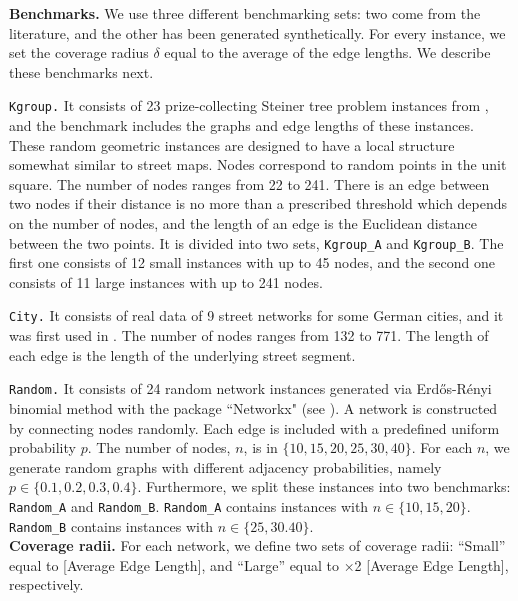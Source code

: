\documentclass[review]{elsarticle}
\newcommand{\dlt}{{\delta}}
\theoremstyle{definition}
\begin{document}
\textbf{Benchmarks.}
We use three different benchmarking sets: two come from the literature, and the other has been generated synthetically. For every instance, we set the coverage radius $\dlt$ equal to the  average of the edge lengths. We describe these benchmarks next.

\texttt{Kgroup.} It consists of 23 prize-collecting Steiner tree problem instances from \cite{Ljubic2006}, and the benchmark includes the graphs and edge lengths of these instances. These random geometric instances are designed to have a local structure somewhat similar to street maps. Nodes correspond to random points in the unit square. The number of nodes ranges from 22 to 241. There
is an edge between two nodes if their distance is no more than a prescribed threshold which depends on the number of nodes, and the length of an edge is the Euclidean distance between the two points. It is divided into two sets, \texttt{Kgroup\_A} and  \texttt{Kgroup\_B}. The first one consists of 12 small instances with up to 45 nodes, and the second one consists of 11 large instances with up to 241 nodes.  

\texttt{City.} It consists of real data of 9  street networks for some German cities, and it was first used in \cite{Kalsics}.  The number of nodes ranges from 132 to 771. The length of each edge is the length of the underlying street segment.

\texttt{Random.} It consists of 24  random network instances generated via Erdős-Rényi binomial method with the package ``Networkx" (see \cite{SciPyProceedings_11}).  A network is constructed by connecting nodes randomly. Each edge is included with a predefined uniform probability $p$. The number of nodes, $n$, is in $\{10, 15, 20, 25, 30, 40\}$. For each $n$, we generate random graphs with different adjacency probabilities, namely  $p \in \{0.1, 0.2, 0.3, 0.4\}$. Furthermore, we split these instances into two benchmarks: \texttt{Random\_A} and \texttt{Random\_B}.  \texttt{Random\_A} contains instances with $n \in \{10,15,20\}$.   \texttt{Random\_B} contains instances with $n \in \{25,30.40\}$. \\



\textbf{Coverage radii.}
For each network, we define two sets of coverage radii: ``Small'' equal to [Average Edge
Length], and ``Large'' equal to ×2 [Average Edge Length], respectively.
\\

\end{document}
